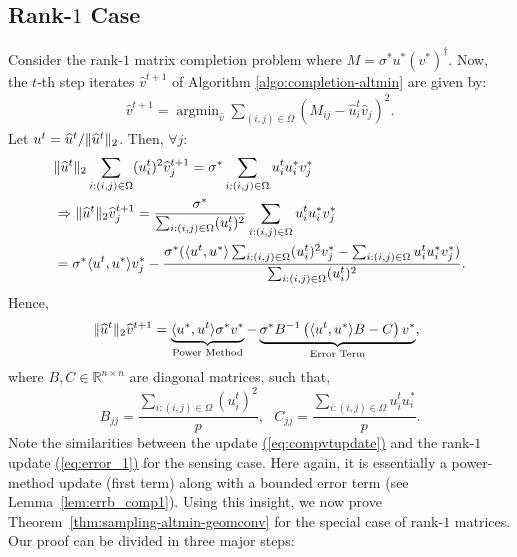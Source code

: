\documentclass[11pt]{article}
\renewcommand{\eqref}[1]{\hyperref[#1]{(\ref*{#1})}}
\theoremstyle{plain}
\theoremstyle{definition}
\DeclareMathOperator*{\argmin}{argmin}
\newcommand{\so}{\sigma^*}
\newcommand{\vto}{v^{t+1}}
\newcommand{\ut}{u^t}
\newcommand{\uo}{u^* }
\newcommand{\vo}{v^* }
\newcommand{\wvto}{\widehat{v}^{t+1}}
\newcommand{\ip}[2]{\langle #1, #2 \rangle}
\newcommand{\vt}{\vto}
\newcommand{\vht}{\wvto}
\begin{document}
\subsection{Rank-$1$ Case}
Consider the rank-$1$ matrix completion problem where $M=\so\uo(\vo)^\dag$.
Now, the $t$-th step iterates $\vht$ of Algorithm \ref{algo:completion-altmin} are given by: 
\begin{align*}
  \vht=\argmin_{\widehat{v}} \sum_{(i,j)\in \Omega}(M_{ij}-\widehat{u}^t_i\widehat{v}_j)^2.%
\end{align*}
Let $\ut=\uht/\|\uht\|_2$. Then, $\forall j$:{\small
\begin{align}
\hspace*{-10pt}&\|\uht\|_2\sum_{i:(i,j)\in \Omega}(\ut_i)^2\vht_j =\so\sum_{i:(i,j)\in\Omega}\ut_i\uo_i\vo_j \nonumber\\
&\Rightarrow \|\uht\|_2\vht_j = \frac{\so}{\sum_{i:(i,j)\in \Omega}(\ut_i)^2}\sum_{i:(i,j)\in\Omega}\ut_i\uo_i\vo_j\nonumber\\
&=\sigma^*\ip{\ut}{\uo}\vo_j-\frac{\sigma^*(\ip{\ut}{\uo}\sum_{i:(i,j)\in\Omega}(\ut_i)^2\vo_j-\sum_{i:(i,j)\in\Omega}\ut_i\uo_i\vo_j)}{\sum_{i:(i,j)\in\Omega}(\ut_i)^2}.\label{eq:r1compupdate}
\end{align}}
Hence,
\begin{align}
\hspace*{-5pt}  \|\uht\|_2\vht=\underbrace{\ip{\uo}{\ut}\sigma^*\vo}_{\text{Power Method}}-\underbrace{\sigma^*B^{-1}\left(\ip{\ut}{\uo}B-C\right)\vo}_{\text{Error Term}},%
\label{eq:compvtupdate}
\end{align}
where $B, C\in \mathbb{R}^{n\times n}$ are diagonal matrices, such that, 
\begin{equation}
  \label{eq:bc_comp}
  B_{jj}=\frac{\sum_{i:(i,j)\in \Omega}(\ut_i)^2}{p}, \ \ \ C_{jj}=\frac{\sum_{i:(i,j)\in\Omega}\ut_i\uo_i}{p}. 
\end{equation}
Note the similarities between the update \eqref{eq:compvtupdate} and  the rank-$1$ update \eqref{eq:error_1} for the sensing case. Here again, it is essentially a power-method update (first term) along with a bounded error term (see Lemma~\ref{lem:errb_comp1}). Using this insight, we now prove Theorem~\ref{thm:sampling-altmin-geomconv} for the special case of rank-$1$ matrices. 
Our proof can be divided in three major steps:
\end{document}
